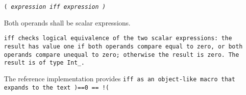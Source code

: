 
\tt{(} \it{expression} \tt{iff} \it{expression} \tt{)}


Both operands shall be scalar expressions.


\tt{iff} checks logical equivalence of the two scalar expressions:
the result has value one if both operands compare equal to zero,
or both operands compare unequal to zero; otherwise the result is zero.
The result is of type \tt{Int_}.

\note The reference implementation provides \tt{iff} as an
object-like macro that expands to the text \tt{)==0 == !(}
